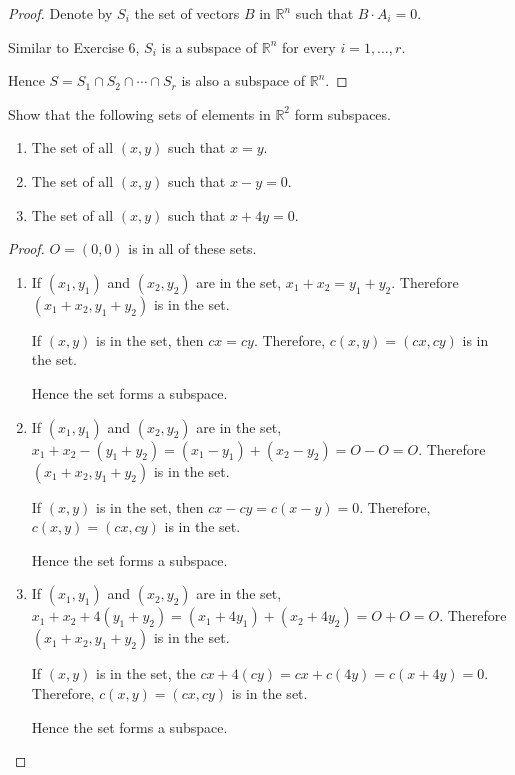 \begin{proof}
    Denote by $S_{i}$ the set of vectors $B$ in $\mathbb{R}^{n}$ such that $B\cdot A_{i} = 0$.

    Similar to Exercise 6, $S_{i}$ is a subspace of $\mathbb{R}^{n}$ for every $i = 1,\ldots, r$.

    Hence $S = S_{1}\cap S_{2}\cap \cdots\cap S_{r}$ is also a subspace of $\mathbb{R}^{n}$.
\end{proof}

\begin{exercise}
    Show that the following sets of elements in $\mathbb{R}^{2}$ form subspaces.
    \begin{enumerate}[label={(\alph*)}]
        \item The set of all $(x, y)$ such that $x = y$.
        \item The set of all $(x, y)$ such that $x - y = 0$.
        \item The set of all $(x, y)$ such that $x + 4y = 0$.
    \end{enumerate}
\end{exercise}

\begin{proof}
    $O = (0, 0)$ is in all of these sets.

    \begin{enumerate}[label={(\alph*)}]
        \item If $(x_{1}, y_{1})$ and $(x_{2}, y_{2})$ are in the set, $x_{1} + x_{2} = y_{1} + y_{2}$. Therefore $(x_{1} + x_{2}, y_{1} + y_{2})$ is in the set.

              If $(x, y)$ is in the set, then $cx = cy$. Therefore, $c(x, y) = (cx, cy)$ is in the set.

              Hence the set forms a subspace.
        \item If $(x_{1}, y_{1})$ and $(x_{2}, y_{2})$ are in the set, $x_{1} + x_{2} - (y_{1} + y_{2}) = (x_{1} - y_{1}) + (x_{2} - y_{2}) = O - O = O$. Therefore $(x_{1} + x_{2}, y_{1} + y_{2})$ is in the set.

              If $(x, y)$ is in the set, then $cx - cy = c(x - y) = 0$. Therefore, $c(x, y) = (cx, cy)$ is in the set.

              Hence the set forms a subspace.
        \item If $(x_{1}, y_{1})$ and $(x_{2}, y_{2})$ are in the set, $x_{1} + x_{2} + 4(y_{1} + y_{2}) = (x_{1} + 4y_{1}) + (x_{2} + 4y_{2}) = O + O = O$. Therefore $(x_{1} + x_{2}, y_{1} + y_{2})$ is in the set.

              If $(x, y)$ is in the set, the $cx + 4(cy) = cx + c(4y) = c(x + 4y) = 0$. Therefore, $c(x, y) = (cx, cy)$ is in the set.

              Hence the set forms a subspace.
    \end{enumerate}
\end{proof}

